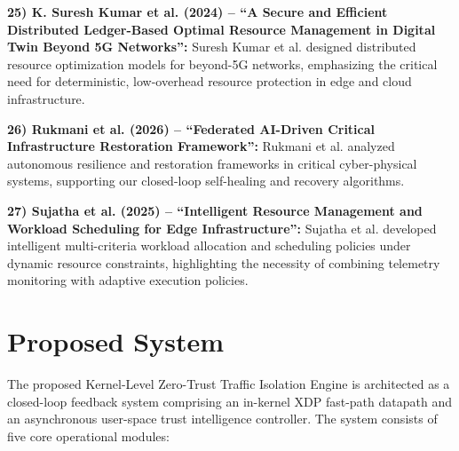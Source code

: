 \documentclass[conference]{IEEEtran}
\begin{document}
\noindent
\textbf{25) K. Suresh Kumar et al. (2024) -- ``A Secure and Efficient Distributed Ledger-Based Optimal Resource Management in Digital Twin Beyond 5G Networks'':} 
Suresh Kumar et al. designed distributed resource optimization models for beyond-5G networks, emphasizing the critical need for deterministic, low-overhead resource protection in edge and cloud infrastructure.

\noindent
\textbf{26) Rukmani et al. (2026) -- ``Federated AI-Driven Critical Infrastructure Restoration Framework'':} 
Rukmani et al. analyzed autonomous resilience and restoration frameworks in critical cyber-physical systems, supporting our closed-loop self-healing and recovery algorithms.

\noindent
\textbf{27) Sujatha et al. (2025) -- ``Intelligent Resource Management and Workload Scheduling for Edge Infrastructure'':} 
Sujatha et al. developed intelligent multi-criteria workload allocation and scheduling policies under dynamic resource constraints, highlighting the necessity of combining telemetry monitoring with adaptive execution policies.

\section{Proposed System}
The proposed Kernel-Level Zero-Trust Traffic Isolation Engine is architected as a closed-loop feedback system comprising an in-kernel XDP fast-path datapath and an asynchronous user-space trust intelligence controller. The system consists of five core operational modules:
\end{document}
